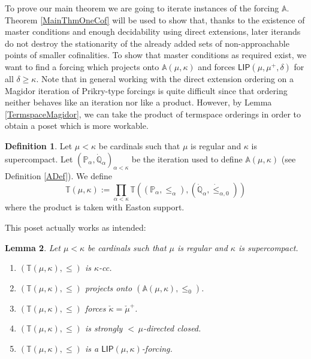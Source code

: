 \documentclass[a4paper]{amsart}
\theoremstyle{definition}
\newtheorem{mydef}{Definition}[section]
\theoremstyle{remark}
\theoremstyle{plain}
\newtheorem{mylem}[mydef]{Lemma}
\numberwithin{mydef}{section}
\newcommand{\dA}{\mathbb{A}}
\newcommand{\dP}{\mathbb{P}}
\newcommand{\dQ}{\mathbb{Q}}
\newcommand{\dT}{\mathbb{T}}
\newcommand{\LIP}{\mathsf{LIP}}
\begin{document}
	To prove our main theorem we are going to iterate instances of the forcing $\dA$. Theorem \ref{MainThmOneCof} will be used to show that, thanks to the existence of master conditions and enough decidability using direct extensions, later iterands do not destroy the stationarity of the already added sets of non-approachable points of smaller cofinalities. To show that master conditions as required exist, we want to find a forcing which projects onto $\dA(\mu,\kappa)$ and forces $\LIP(\mu,\mu^+,\delta)$ for all $\delta\geq\kappa$. Note that in general working with the direct extension ordering on a Magidor iteration of Prikry-type forcings is quite difficult since that ordering neither behaves like an iteration nor like a product. However, by Lemma \ref{TermspaceMagidor}, we can take the product of termspace orderings in order to obtain a poset which is more workable.
	
	\begin{mydef}\label{TDef}
		Let $\mu<\kappa$ be cardinals such that $\mu$ is regular and $\kappa$ is supercompact. Let $(\dP_{\alpha},\dot{\dQ}_{\alpha})_{\alpha<\kappa}$ be the iteration used to define $\dA(\mu,\kappa)$ (see Definition \ref{ADef}). We define
		$$\dT(\mu,\kappa):=\prod_{\alpha<\kappa}\dT((\dP_{\alpha},\leq_{\alpha}),(\dot{\dQ}_{\alpha},\dot{\leq}_{\alpha,0}))$$
		where the product is taken with Easton support.
	\end{mydef}
	
	This poset actually works as intended:
	
	\begin{mylem}\label{TProperties}
		Let $\mu<\kappa$ be cardinals such that $\mu$ is regular and $\kappa$ is supercompact.
		\begin{enumerate}
			\item $(\dT(\mu,\kappa),\leq)$ is $\kappa$-cc.
			\item $(\dT(\mu,\kappa),\leq)$ projects onto $(\dA(\mu,\kappa),\leq_0)$.
			\item $(\dT(\mu,\kappa),\leq)$ forces $\check{\kappa}=\check{\mu}^+$.
			\item $(\dT(\mu,\kappa),\leq)$ is strongly ${<}\,\mu$-directed closed.
			\item $(\dT(\mu,\kappa),\leq)$ is a $\LIP(\mu,\kappa)$-forcing.
		\end{enumerate}
	\end{mylem}
	
\end{document}

